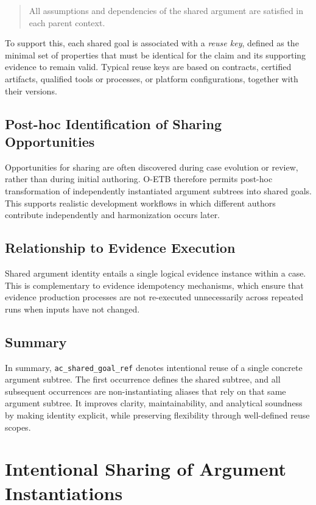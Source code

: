 \documentclass[12pt,twoside,a4paper]{article}
\begin{document}
\begin{quote}
All assumptions and dependencies of the shared argument are satisfied in each parent context.
\end{quote}

To support this, each shared goal is associated with a \emph{reuse key}, defined as the minimal set of properties that must be identical for the claim and its supporting evidence to remain valid. Typical reuse keys are based on contracts, certified artifacts, qualified tools or processes, or platform configurations, together with their versions.

\subsection{Post-hoc Identification of Sharing Opportunities}

Opportunities for sharing are often discovered during case evolution or review, rather than during initial authoring. O-ETB therefore permits post-hoc transformation of independently instantiated argument subtrees into shared goals. This supports realistic development workflows in which different authors contribute independently and harmonization occurs later.

\subsection{Relationship to Evidence Execution}

Shared argument identity entails a single logical evidence instance within a case. This is complementary to evidence idempotency mechanisms, which ensure that evidence production processes are not re-executed unnecessarily across repeated runs when inputs have not changed.

\subsection{Summary}

In summary, \texttt{ac\_shared\_goal\_ref}
denotes intentional reuse of a single concrete argument subtree.
The first occurrence defines the shared subtree, and all subsequent occurrences are non-instantiating aliases that rely on that same argument subtree.
It improves clarity, maintainability, and analytical soundness by making identity explicit, while preserving flexibility through well-defined reuse scopes.

\section{Intentional Sharing of Argument Instantiations}
\label{sec:shared-argument-instantiations}
\end{document}
